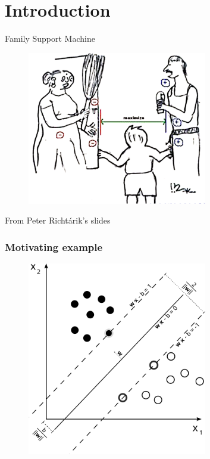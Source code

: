 \section{Introduction}
\begin{frame}{Family Support Machine}
    \begin{figure}[htbp]
        \centering
        \includegraphics[height=0.6\textheight, width=0.7\textwidth]{images/family.png}
    \end{figure}
    From Peter Richt\'arik's slides
\end{frame}

\begin{frame}[fragile]
    \frametitle{Motivating example}
    \begin{figure}[htbp]
        \centering
        \includegraphics[height=0.8\textheight, width=0.7\textwidth]{images/svm_ex.png}
    \end{figure}
\end{frame}

